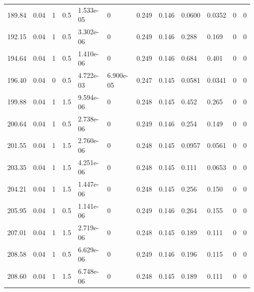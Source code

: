 \documentclass[preview]{standalone}
\begin{document}
{{{\begin{tabular}{L{1.2cm}C{1.2cm} C{0.3cm}C{0.5cm} C{1.4cm}C{1.4cm} C{1.4cm}C{1.4cm} C{1.6cm}C{1.6cm} C{1.6cm}C{1.6cm}}
  189.84  &  0.04  & 1     & 0.5 &  1.533e-05  & 0  &  0.249&   0.146& 0.0600 & 0.0352   &  0 & 0  \\ 
  192.15  &  0.04  & 1     & 0.5 &  3.302e-06  & 0  &  0.249&   0.146& 0.288 & 0.169   &  0 & 0  \\ 
  194.64  &  0.04  & 1     & 0.5 &  1.410e-06  & 0  &  0.249&   0.146& 0.684 & 0.401   &  0 & 0  \\ 
  196.40  &  0.04  & 0     & 0.5 &  4.722e-03  & 6.900e-05  &  0.247&   0.145& 0.0581 & 0.0341   &  0 & 0  \\ 
  199.88  &  0.04  & 1     & 1.5 &  9.594e-06  & 0  &  0.248&   0.145& 0.452 & 0.265   &  0 & 0  \\ 
  200.64  &  0.04  & 1     & 0.5 &  2.738e-06  & 0  &  0.249&   0.146& 0.254 & 0.149   &  0 & 0  \\ 
  201.55  &  0.04  & 1     & 1.5 &  2.760e-06  & 0  &  0.248&   0.145& 0.0957 & 0.0561   &  0 & 0  \\ 
  203.35  &  0.04  & 1     & 1.5 &  4.251e-06  & 0  &  0.248&   0.145& 0.111 & 0.0653   &  0 & 0  \\ 
  204.21  &  0.04  & 1     & 1.5 &  1.447e-06  & 0  &  0.248&   0.145& 0.256 & 0.150   &  0 & 0  \\ 
  205.95  &  0.04  & 1     & 0.5 &  1.141e-06  & 0  &  0.249&   0.146& 0.264 & 0.155   &  0 & 0  \\ 
  207.01  &  0.04  & 1     & 1.5 &  2.719e-06  & 0  &  0.248&   0.145& 0.189 & 0.111   &  0 & 0  \\ 
  208.58  &  0.04  & 1     & 0.5 &  6.629e-06  & 0  &  0.249&   0.146& 0.196 & 0.115   &  0 & 0  \\ 
  208.60  &  0.04  & 1     & 1.5 &  6.748e-06  & 0  &  0.248&   0.145& 0.189 & 0.111   &  0 & 0  \\ 
\hline 
\end{tabular} 

}}}
\end{document}
